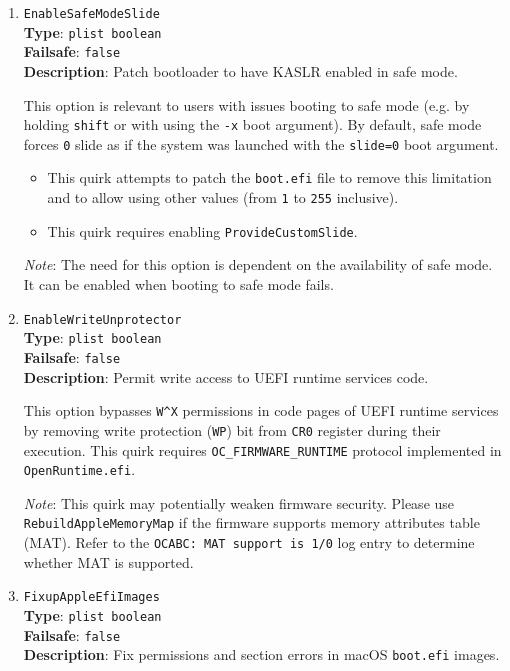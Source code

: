 \documentclass[]{article}
\providecommand{\tightlist}{%
  \setlength{\itemsep}{0pt}\setlength{\parskip}{0pt}}
\begin{document}
\begin{enumerate}
\item
  \texttt{EnableSafeModeSlide}\\
  \textbf{Type}: \texttt{plist\ boolean}\\
  \textbf{Failsafe}: \texttt{false}\\
  \textbf{Description}: Patch bootloader to have KASLR enabled in safe mode.

  This option is relevant to users with issues booting to safe mode
  (e.g. by holding \texttt{shift} or with using the \texttt{-x} boot argument). By
  default, safe mode forces \texttt{0} slide as if the system was launched with the
  \texttt{slide=0} boot argument.

  \begin{itemize}
    \tightlist
    \item This quirk attempts to patch the \texttt{boot.efi} file to remove this limitation
    and to allow using other values (from \texttt{1} to \texttt{255} inclusive).
    \item This quirk requires enabling \texttt{ProvideCustomSlide}.
    \end{itemize}

  \emph{Note}: The need for this option is dependent on the availability of safe mode.
  It can be enabled when booting to safe mode fails.

\item
  \texttt{EnableWriteUnprotector}\\
  \textbf{Type}: \texttt{plist\ boolean}\\
  \textbf{Failsafe}: \texttt{false}\\
  \textbf{Description}: Permit write access to UEFI runtime services code.

  This option bypasses \texttt{W\^{}X} permissions in code pages of UEFI runtime
  services by removing write protection (\texttt{WP}) bit from \texttt{CR0}
  register during their execution. This quirk requires \texttt{OC\_FIRMWARE\_RUNTIME}
  protocol implemented in \texttt{OpenRuntime.efi}.

  \emph{Note}: This quirk may potentially weaken firmware security. Please use
  \texttt{RebuildAppleMemoryMap} if the firmware supports memory attributes table (MAT).
  Refer to the \texttt{OCABC: MAT support is 1/0} log entry to determine whether MAT is supported.

\item
  \texttt{FixupAppleEfiImages}\\
  \textbf{Type}: \texttt{plist\ boolean}\\
  \textbf{Failsafe}: \texttt{false}\\
  \textbf{Description}: Fix permissions and section errors in macOS \texttt{boot.efi} images.


\end{enumerate}
\end{document}
